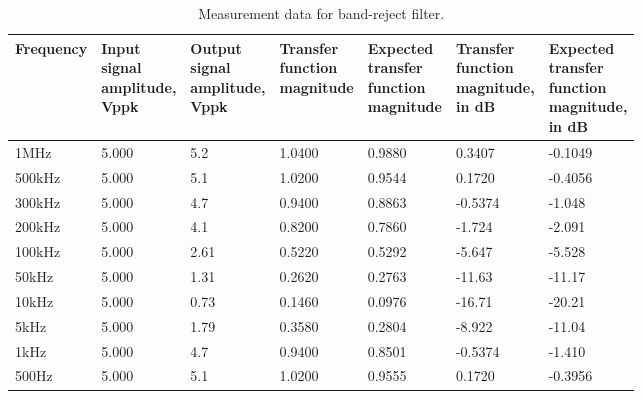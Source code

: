 \begin{table}[H]
	\centering
	\begin{tabular}{|l|l|l|l|l|l|l|}
	\hline
	Frequency&\makecell[l]{Input\\signal\\amplitude,\\Vppk}&\makecell[l]{Output\\signal\\amplitude,\\Vppk}&\makecell[l]{Transfer\\function\\magnitude}&\makecell[l]{Expected\\transfer\\function\\magnitude}&\makecell[l]{Transfer\\function\\magnitude,\\in dB}&\makecell[l]{Expected\\transfer\\function\\magnitude,\\in dB}\\
	\hline
	1MHz&5.000&5.2&1.0400&0.9880&0.3407&-0.1049\\
	\hline
	500kHz&5.000&5.1&1.0200&0.9544&0.1720&-0.4056\\
	\hline
	300kHz&5.000&4.7&0.9400&0.8863&-0.5374&-1.048\\
	\hline
	200kHz&5.000&4.1&0.8200&0.7860&-1.724&-2.091\\
	\hline
	100kHz&5.000&2.61&0.5220&0.5292&-5.647&-5.528\\
	\hline
	50kHz&5.000&1.31&0.2620&0.2763&-11.63&-11.17\\
	\hline
	10kHz&5.000&0.73&0.1460&0.0976&-16.71&-20.21\\
	\hline
	5kHz&5.000&1.79&0.3580&0.2804&-8.922&-11.04\\
	\hline
	1kHz&5.000&4.7&0.9400&0.8501&-0.5374&-1.410\\
	\hline
	500Hz&5.000&5.1&1.0200&0.9555&0.1720&-0.3956\\
	\hline
	\end{tabular}
	\caption{Measurement data for band-reject filter.}
\end{table}
